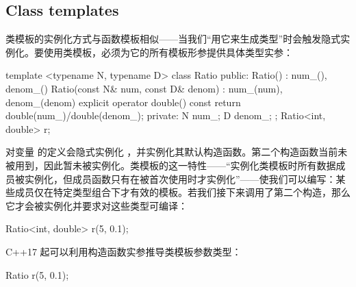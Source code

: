 \subsection{Class templates}
类模板的实例化方式与函数模板相似——当我们“用它来生成类型”时会触发隐式实例化。要使用类模板，必须为它的所有模板形参提供具体类型实参：

\begin{code}
template <typename N, typename D> class Ratio {
  public:
  Ratio() : num_(), denom_() {}
  Ratio(const N& num, const D& denom) :
    num_(num), denom_(denom) {}
  explicit operator double() const {
    return double(num_)/double(denom_);
  }
  private:
  N num_;
  D denom_;
};
Ratio<int, double> r;
\end{code}

对变量  的定义会隐式实例化 ，并实例化其默认构造函数。第二个构造函数当前未被用到，因此暂未被实例化。类模板的这一特性——“实例化类模板时所有数据成员被实例化，但成员函数只有在被首次使用时才实例化”——使我们可以编写：某些成员仅在特定类型组合下才有效的模板。若我们接下来调用了第二个构造，那么它才会被实例化并要求对这些类型可编译：

\begin{code}
Ratio<int, double> r(5, 0.1);
\end{code}

C++17 起可以利用构造函数实参推导类模板参数类型：

\begin{code}
Ratio r(5, 0.1);
\end{code}


